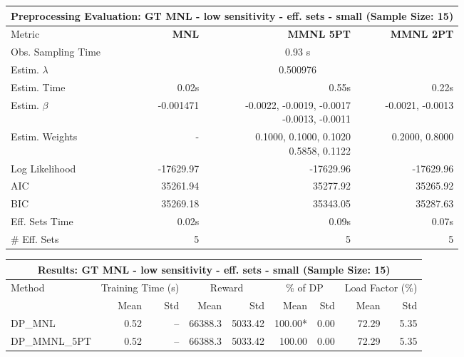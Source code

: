 
\begin{samepage}
\begin{center}
  \small
  \begin{tabular}{l|r|r|r}
    \toprule
    \multicolumn{4}{c}{\textbf{Preprocessing Evaluation: GT MNL - low sensitivity - eff. sets - small (Sample Size: 15)}} \\
    \midrule
    Metric & \textbf{MNL} & \textbf{MMNL 5PT} & \textbf{MMNL 2PT} \\
    \midrule
    Obs. Sampling Time & \multicolumn{3}{c}{0.93 s} \\
    Estim. $\lambda$ & \multicolumn{3}{c}{0.500976} \\
    Estim. Time & 0.02s & 0.55s & 0.22s \\
    Estim. $\beta$ & -0.001471 & \makecell[tr]{-0.0022, -0.0019, -0.0017 \\ -0.0013, -0.0011} & -0.0021, -0.0013 \\
    Estim. Weights & - & \makecell[tr]{0.1000, 0.1000, 0.1020 \\ 0.5858, 0.1122} & 0.2000, 0.8000 \\
    Log Likelihood & -17629.97 & -17629.96 & -17629.96 \\
    AIC & 35261.94 & 35277.92 & 35265.92 \\
    BIC & 35269.18 & 35343.05 & 35287.63 \\
    Eff. Sets Time & 0.02s & 0.09s & 0.07s \\
    \# Eff. Sets & 5 & 5 & 5 \\
    \bottomrule
  \end{tabular}
\end{center}
\begin{center}
  \small
  \begin{tabular}{l|rr|rr|rr|rr}
    \toprule
    \multicolumn{9}{c}{\textbf{Results: GT MNL - low sensitivity - eff. sets - small (Sample Size: 15)}} \\
    \midrule
    Method & \multicolumn{2}{c|}{Training Time (s)} & \multicolumn{2}{c|}{Reward} & \multicolumn{2}{c|}{\% of DP} & \multicolumn{2}{c}{Load Factor (\%)} \\
    & Mean & Std & Mean & Std & Mean & Std & Mean & Std \\
    \midrule
    DP\_MNL      &     0.52 &    -- &    66388.3 &    5033.42 & 100.00* &    0.00 &   72.29 &    5.35 \\
    DP\_MMNL\_5PT &     0.52 &    -- &    66388.3 &    5033.42 &  100.00 &    0.00 &   72.29 &    5.35 \\

\end{tabular}
\end{center}
\end{samepage}
